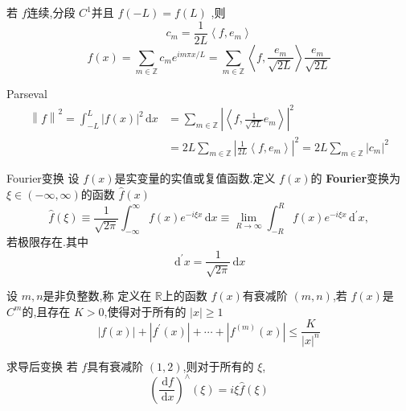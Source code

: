 \documentclass[../../main.tex]{subfiles}
\begin{document}
\begin{proposition}
    若 \(  f  \)连续,分段 \(  C^{1}  \)并且 \(  f\left( -L \right)= f\left( L \right)    \)   ,则 \[
    c_{m}= \frac{1 }{2L } \left<f, e_{m} \right> 
    \] \[
    f\left( x \right)= \sum _{m\in \mathbb{Z} }c_{m} e^{im \pi x /L}=  \sum _{m \in \mathbb{Z} }  \left<f,\frac{e_{m} }{\sqrt{2L} }  \right> \frac{e_{m} }{\sqrt{2L} } 
    \]
\end{proposition}

\begin{theorem}{Parseval}
     \[
     \begin{aligned}
     \left\| f \right\|^{2}= \int_{-L}^{L}\left| f\left( x \right)  \right|^{2}\,\mathrm{d} x&=  \sum _{m \in \mathbb{Z} }   \left| \left<f, \frac{1 }{\sqrt{2L} }e_{m}  \right> \right|^{2}\\ 
      &=  2L \sum _{m \in \mathbb{Z} } \left| \frac{1 }{2L } \left<f, e_{m} \right>  \right|^{2}=  2L\sum _{m \in \mathbb{Z} }\left| c_{m} \right|^{2}  
     \end{aligned}
     \]
\end{theorem}


\begin{definition}{Fourier变换}
    设 \(  f\left( x \right)   \)是实变量的实值或复值函数.定义 \(  f\left( x \right)   \)的 \textbf{Fourier}变换为 \(   \xi \in \left( -\infty,\infty \right)   \)的函数 \(  \hat{f}\left( x \right)   \) \[
    \hat{f}\left(  \xi  \right)\equiv  \frac{1 }{\sqrt{2\pi } }\int_{-\infty}^{\infty}f\left( x \right)e^{-i \xi x}\,\mathrm{d} x  \equiv  \lim_{R\to \infty} \int_{-R}^{R}f\left( x \right)e^{-i  \xi x}\,\mathrm{d} ^{\prime} x,  
    \]若极限存在.其中 \[
    \,\mathrm{d} ^{\prime} x= \frac{1 }{\sqrt{2\pi } } \,\mathrm{d} x 
    \]   
\end{definition}

\begin{definition}
    设 \(  m,n  \)是非负整数,称 定义在 \(  \mathbb{R}   \)上的函数 \(  f\left( x \right)   \)有衰减阶 \(  \left( m,n \right)   \),若 \(  f\left( x \right)   \)是 \(  C^{m}  \)的,且存在 \(  K> 0  \),使得对于所有的 \(  \left| x \right|\ge 1   \) \[
    \left| f\left( x \right)  \right|+ \left| f^{\prime} \left( x \right)  \right|+ \cdots + \left| f^{\left( m \right) }\left( x \right)  \right|\le \frac{K }{\left| x \right|^{n}  }    
    \]        
\end{definition}
\begin{proposition}{求导后变换}
    若 \(  f  \)具有衰减阶 \(  \left( 1,2 \right)   \),则对于所有的 \(   \xi   \), \[
    \left( \frac{\,\mathrm{d} f }{\,\mathrm{d} x }  \right)^{\wedge } \left(  \xi  \right)= i  \xi  \hat{f}\left(  \xi  \right)   
    \]   
\end{proposition}
\end{document}
